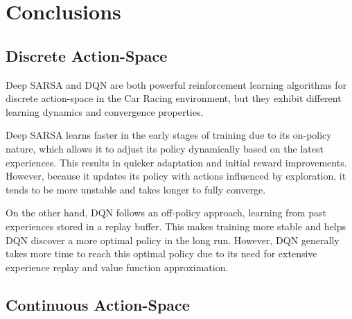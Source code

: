 \documentclass[../CSC_52081_EP.tex]{subfiles}
\begin{document}
    \section{Conclusions}
        \subsection{Discrete Action-Space}

        Deep SARSA and DQN are both powerful reinforcement learning algorithms for discrete action-space in the Car Racing environment, but they exhibit different learning dynamics and convergence properties.

        Deep SARSA learns faster in the early stages of training due to its on-policy nature, which allows it to adjust its policy dynamically based on the latest experiences. This results in quicker adaptation and initial reward improvements. However, because it updates its policy with actions influenced by exploration, it tends to be more unstable and takes longer to fully converge.

        On the other hand, DQN follows an off-policy approach, learning from past experiences stored in a replay buffer. This makes training more stable and helps DQN discover a more optimal policy in the long run. However, DQN generally takes more time to reach this optimal policy due to its need for extensive experience replay and value function approximation.

        \subsection{Continuous Action-Space}
\end{document}

